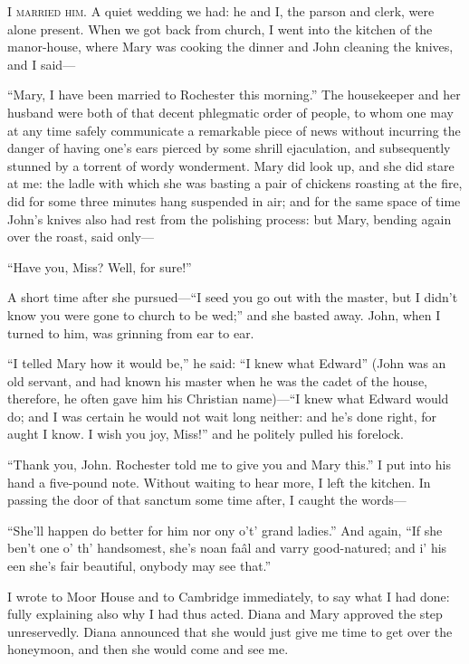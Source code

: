 
 \textsc{I married him.} A quiet wedding we had: he and I, the parson and
clerk, were alone present. When we got back from church, I went into
the kitchen of the manor-house, where Mary was cooking the dinner and
John cleaning the knives, and I said---

\enquote{Mary, I have been married to \Mr{} Rochester this morning.} The
housekeeper and her husband were both of that decent phlegmatic order of
people, to whom one may at any time safely communicate a remarkable
piece of news without incurring the danger of having one's ears pierced
by some shrill ejaculation, and subsequently stunned by a torrent of
wordy wonderment. Mary did look up, and she did stare at me: the ladle
with which she was basting a pair of chickens roasting at the fire, did
for some three minutes hang suspended in air; and for the same space of
time John's knives also had rest from the polishing process: but Mary,
bending again over the roast, said only---

\enquote{Have you, Miss? Well, for sure!}

A short time after she pursued---\enquote{I seed you go out with the
master, but I didn't know you were gone to church to be wed;} and she
basted away. John, when I turned to him, was grinning from ear to ear.

\enquote{I telled Mary how it would be,} he said: \enquote{I knew what
\Mr{} Edward} (John was an old servant, and had known his master when he
was the cadet of the house, therefore, he often gave him his Christian
name)---\enquote{I knew what \Mr{} Edward would do; and I was certain he
would not wait long neither: and he's done right, for aught I know. I
wish you joy, Miss!} and he politely pulled his forelock.

\enquote{Thank you, John. \Mr{} Rochester told me to give you and Mary
this.} I put into his hand a five-pound note. Without waiting to hear
more, I left the kitchen. In passing the door of that sanctum some time
after, I caught the words---

\enquote{She'll happen do better for him nor ony o't' grand ladies.} 
And again, \enquote{If she ben't one o' th' handsomest, she's noan faâl
and varry good-natured; and i' his een she's fair beautiful, onybody may
see that.}

I wrote to Moor House and to Cambridge immediately, to say what I had
done: fully explaining also why I had thus acted. Diana and Mary
approved the step unreservedly. Diana announced that she would just
give me time to get over the honeymoon, and then she would come and see
me.


